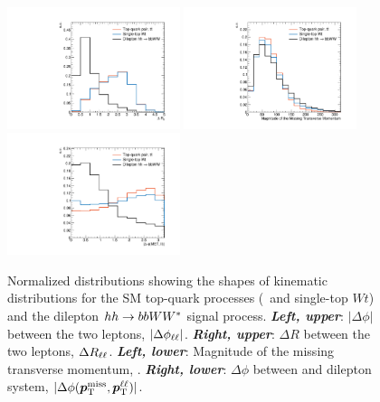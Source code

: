 \begin{figure}[!htb]
    \begin{center}
        \includegraphics[width=0.45\textwidth]{figures/search_hh/signal_pheno/shape_plots/hh_shape_plot_dRll}
        \includegraphics[width=0.45\textwidth]{figures/search_hh/signal_pheno/shape_plots/hh_shape_plot_met}
        \includegraphics[width=0.45\textwidth]{figures/search_hh/signal_pheno/shape_plots/hh_shape_plot_dphi_met_ll}
        \caption{
            Normalized distributions showing the shapes of kinematic distributions for the SM
            top-quark processes (\ttbar~and single-top $Wt$) and the dilepton $hh \rightarrow bbWW^*$ signal process.
            \textit{\textbf{Left, upper}}: $|\Delta \phi|$ between the two leptons, $|\Delta \phi_{\ell\ell}|$.
            \textit{\textbf{Right, upper}}: $\Delta R$ between the two leptons, $\Delta R_{\ell\ell}$.
            \textit{\textbf{Left, lower}}: Magnitude of the missing transverse momentum, \met.
            \textit{\textbf{Right, lower}}: $\Delta \phi$ between \met and dilepton system, $|\Delta \phi (\bm{p}_{\text{T}}^{\text{miss}}, \bm{p}_{\text{T}}^{\ell\ell})|$.
        }
        \label{fig:hh_kin_2}
    \end{center}
\end{figure}

%
%


